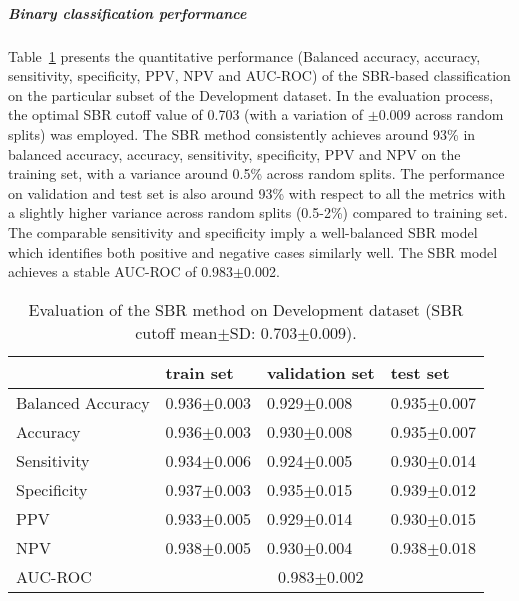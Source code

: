 \subparagraph{Binary classification performance}

Table~\ref{t1:sbr_perf_eval_table} presents the quantitative performance 
(Balanced accuracy, accuracy, sensitivity, specificity, PPV, NPV and AUC-ROC) of the SBR-based classification on the 
particular subset of the Development dataset.
In the evaluation process, the optimal SBR cutoff value of 0.703 (with a variation of $\pm$0.009 across random splits) 
was employed.
The SBR method consistently achieves around 93\% in balanced accuracy, accuracy, sensitivity, specificity, PPV and NPV 
on the training set, with a variance around 0.5\% across random splits.
The performance on validation and test set is also around 93\% with respect to all the metrics
with a slightly higher variance across random splits (0.5-2\%) compared to training set.
The comparable sensitivity and specificity imply a well-balanced SBR model which 
identifies both positive and negative cases similarly well.
The SBR model achieves a stable AUC-ROC of 0.983$\pm$0.002.


\begin{table}[ht]
  \caption{Evaluation of the SBR method on Development dataset (SBR cutoff mean$\pm$SD: 0.703$\pm$0.009).}
  \centering
  \begin{tabular}{llll}
      \hline
                        & train set         & validation set      & test set             \\
      \hline
      Balanced Accuracy & 0.936$\pm$0.003   &   0.929$\pm$0.008   &  0.935$\pm$0.007     \\
      Accuracy          & 0.936$\pm$0.003   &   0.930$\pm$0.008   &  0.935$\pm$0.007     \\
      Sensitivity       &  0.934$\pm$0.006  &   0.924$\pm$0.005   &  0.930$\pm$0.014     \\
      Specificity       & 0.937$\pm$0.003   &   0.935$\pm$0.015   &  0.939$\pm$0.012     \\
      PPV               &  0.933$\pm$0.005  &   0.929$\pm$0.014   &  0.930$\pm$0.015     \\
      NPV               &  0.938$\pm$0.005  &   0.930$\pm$0.004   &  0.938$\pm$0.018     \\
      \hline
      AUC-ROC          &  \multicolumn{3}{c}{0.983$\pm$0.002 }  \\
      \hline
  \end{tabular}
 \label{t1:sbr_perf_eval_table}
\end{table}

